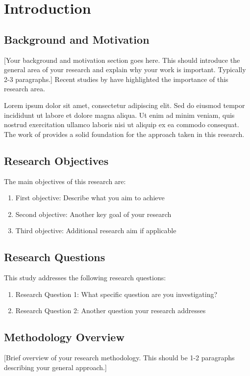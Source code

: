 \chapter{Introduction}

\section{Background and Motivation}
[Your background and motivation section goes here. This should introduce the general area of your research and explain why your work is important. Typically 2-3 paragraphs.] Recent studies by \textcite{chen2022emerging} have highlighted the importance of this research area.

Lorem ipsum dolor sit amet, consectetur adipiscing elit. Sed do eiusmod tempor incididunt ut labore et dolore magna aliqua. Ut enim ad minim veniam, quis nostrud exercitation ullamco laboris nisi ut aliquip ex ea commodo consequat. The work of \textcite{nguyen2020methodological} provides a solid foundation for the approach taken in this research.

\section{Research Objectives}
The main objectives of this research are:
\begin{enumerate}
\item First objective: Describe what you aim to achieve
\item Second objective: Another key goal of your research  
\item Third objective: Additional research aim if applicable
\end{enumerate}

\section{Research Questions}
This study addresses the following research questions:
\begin{enumerate}
\item Research Question 1: What specific question are you investigating?
\item Research Question 2: Another question your research addresses
\end{enumerate}

\section{Methodology Overview}
[Brief overview of your research methodology. This should be 1-2 paragraphs describing your general approach.]

